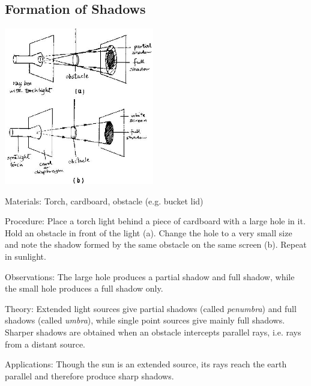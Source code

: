 \begin{multicols}{2}
\subsection{Formation of Shadows}

\begin{center}
\includegraphics[width=0.49\textwidth]{./img/source/shadows.jpg}
\end{center}

\begin{description*}
\item[Materials:]{Torch, cardboard, obstacle (e.g. bucket lid)}
\item[Procedure:]{Place a torch light behind a piece of cardboard with a large hole in it. Hold an obstacle in front of the light (a). Change the hole to a very small size and note the shadow formed by the same obstacle on the same screen (b). Repeat in sunlight.}
\item[Observations:]{The large hole produces a partial shadow and full shadow, while the small hole produces a full shadow only.}
\item[Theory:]{Extended light sources give partial shadows (called \emph{penumbra}) and full shadows (called \emph{umbra}), while single point sources give mainly full shadows. Sharper shadows are obtained when an
obstacle intercepts parallel rays, i.e. rays from a distant source. }
\item[Applications:]{Though the sun is an
extended source, its rays reach the earth parallel and therefore produce sharp shadows.}
\end{description*}


\end{multicols}
